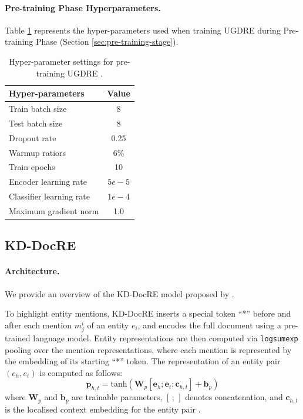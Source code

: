 \paragraph{Pre-training Phase Hyperparameters.}
Table \ref{tab:hyper-params-pretrain-ugdre} represents the hyper-parameters used when training UGDRE during Pre-training Phase (Section \ref{sec:pre-training-stage}).
\begin{table}[!th]
  \centering
  \begin{tabular}{lc}
    \toprule
    \textbf{Hyper-parameters}           & \textbf{Value}\\
    \midrule
    Train batch size                    & 8             \\
    Test batch size                     & 8             \\
    Dropout rate                        & 0.25          \\
    Warmup ratiors                      & 6\%           \\
    Train epochs                        & 10            \\ 
    Encoder learning rate               & $5e-5$        \\
    Classifier learning rate            & $1e-4$        \\
    Maximum gradient norm               & 1.0           \\  \bottomrule
  \end{tabular}
  \caption{Hyper-parameter settings for pre-training UGDRE \citep{sun2023uncertainty}.}
  \label{tab:hyper-params-pretrain-ugdre}
\end{table}

\subsection{KD-DocRE}
\label{sec:kddocre}
\paragraph{Architecture.}
We provide an overview of the KD-DocRE model proposed by \citet{tan2022document}.

To highlight entity mentions, KD-DocRE inserts a special token ``*'' before and after each mention $m_j^i$ of an entity $e_i$, and encodes the full document using a pre-trained language model. Entity representations are then computed via \texttt{logsumexp} pooling over the mention representations, where each mention is represented by the embedding of its starting ``*'' token. The representation of an entity pair $(e_h, e_t)$ is computed as follows:
\begin{equation}
    \boldsymbol{p}_{h,t} = \text{tanh}\left(\boldsymbol{W}_p[\boldsymbol{e}_h;\boldsymbol{e}_t;\boldsymbol{c}_{h,t}] + \boldsymbol{b}_p\right)
\end{equation}
where $\boldsymbol{W}_p$ and $\boldsymbol{b}_p$ are trainable parameters, $[\,;\,]$ denotes concatenation, and $\boldsymbol{c}_{h,t}$ is the localised context embedding for the entity pair \citep{zhou2021document}.


